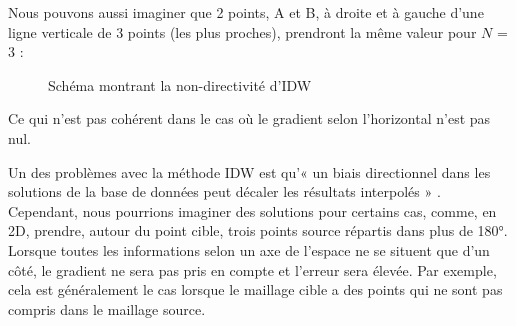 Nous pouvons aussi imaginer que 2 points, A et B, à droite et à gauche d'une ligne verticale de 3 points (les plus proches), prendront la même valeur pour \( N \) = 3 :

\begin{figure}[H]
    \centering
    
    \caption{Schéma montrant la non-directivité d'IDW}
\end{figure}

    
Ce qui n'est pas cohérent dans le cas où le gradient selon l'horizontal n'est pas nul.

Un des problèmes avec la méthode IDW est qu'« un biais directionnel dans les solutions de la base de données peut décaler les résultats interpolés » \cite{palmer2009} \cite{idw-mapscaping}. Cependant, nous pourrions imaginer des solutions pour certains cas, comme, en 2D, prendre, autour du point cible, trois points source répartis dans plus de 180°. \cite{idw-update}  %
Lorsque toutes les informations selon un axe de l'espace ne se situent que d'un côté, le gradient ne sera pas pris en compte et l'erreur sera élevée. Par exemple, cela est généralement le cas lorsque le maillage cible a des points qui ne sont pas compris dans le maillage source.

